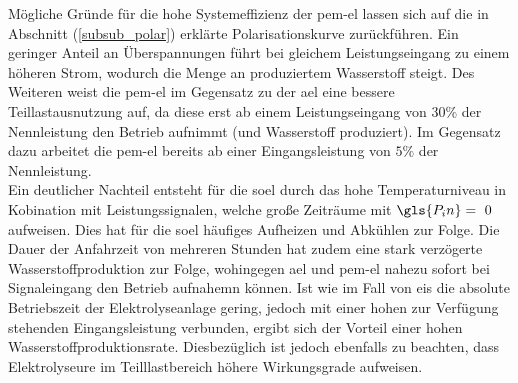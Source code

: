 \documentclass[onecolumn,10pt,titlepage]{article}
\begin{document}
Mögliche Gründe für die hohe Systemeffizienz der \gls{pem}-\gls{el} lassen sich auf die in Abschnitt (\ref{subsub_polar}) erklärte Polarisationskurve zurückführen. Ein geringer Anteil an Überspannungen führt bei gleichem Leistungseingang zu einem höheren Strom, wodurch die Menge an produziertem Wasserstoff steigt. Des Weiteren weist die \gls{pem}-\gls{el} im Gegensatz zu der \gls{ael} eine bessere Teillastausnutzung auf, da diese erst ab einem Leistungseingang von $30\%$ der Nennleistung den Betrieb aufnimmt (und Wasserstoff produziert). Im Gegensatz dazu arbeitet die \gls{pem}-\gls{el} bereits ab einer Eingangsleistung von $5\%$ der Nennleistung.\\ 
Ein deutlicher Nachteil entsteht für die \gls{soel} durch das hohe Temperaturniveau in Kobination mit Leistungssignalen, welche große Zeiträume mit $\gls{P_in}=~0$ aufweisen. Dies hat für die \gls{soel} häufiges Aufheizen und Abkühlen zur Folge. Die Dauer der Anfahrzeit von mehreren Stunden hat zudem eine stark verzögerte Wasserstoffproduktion zur Folge, wohingegen \gls{ael} und \gls{pem}-\gls{el} nahezu sofort bei Signaleingang den Betrieb aufnahemn können.
Ist wie im Fall von \gls{eis} die absolute Betriebszeit der Elektrolyseanlage gering, jedoch mit einer hohen zur Verfügung stehenden Eingangsleistung verbunden, ergibt sich der Vorteil einer hohen Wasserstoffproduktionsrate. Diesbezüglich ist jedoch ebenfalls zu beachten, dass Elektrolyseure im Teilllastbereich höhere Wirkungsgrade aufweisen.
%
\end{document}
